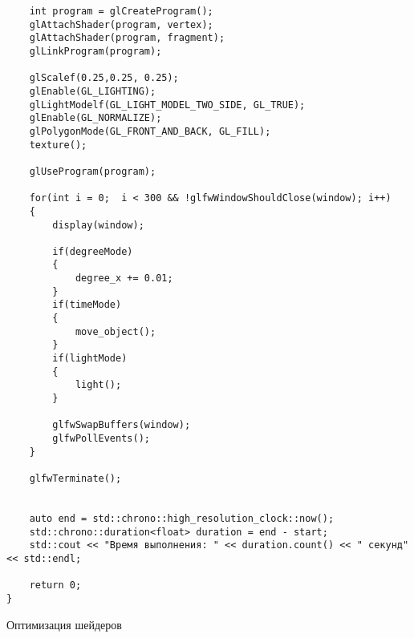 \documentclass[a4paper, 14pt]{extarticle}
\begin{document}
\begin{verbatim}
    int program = glCreateProgram();
    glAttachShader(program, vertex);
    glAttachShader(program, fragment);
    glLinkProgram(program);

    glScalef(0.25,0.25, 0.25);
    glEnable(GL_LIGHTING);
    glLightModelf(GL_LIGHT_MODEL_TWO_SIDE, GL_TRUE);
    glEnable(GL_NORMALIZE);
    glPolygonMode(GL_FRONT_AND_BACK, GL_FILL);
    texture();

    glUseProgram(program);

    for(int i = 0;  i < 300 && !glfwWindowShouldClose(window); i++)
    {
        display(window);

        if(degreeMode)
        {
            degree_x += 0.01;
        }
        if(timeMode)
        {
            move_object();
        }
        if(lightMode)
        {
            light();
        }

        glfwSwapBuffers(window);
        glfwPollEvents();
    }

    glfwTerminate();


    auto end = std::chrono::high_resolution_clock::now();
    std::chrono::duration<float> duration = end - start;
    std::cout << "Время выполнения: " << duration.count() << " секунд" << std::endl;

    return 0;
}    
\end{verbatim}

\begin{center}
\Large {Оптимизация шейдеров} \\ 
\end{center}\normalsize
\end{document}
